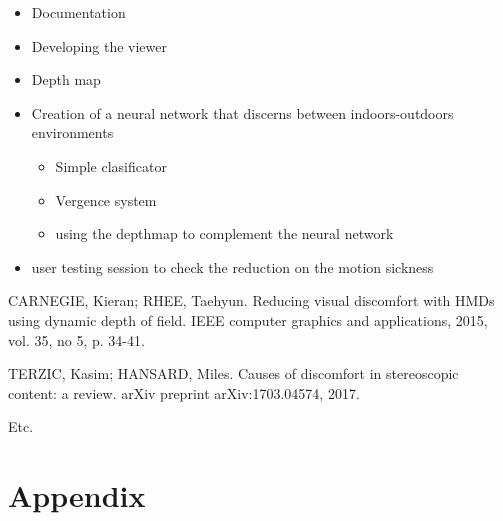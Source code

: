 \documentclass[10pt,a4paper,twocolumn,twoside]{article}
\begin{document}
\begin{itemize}
	\item Documentation 
	\item Developing the viewer
	\item Depth map
	\item Creation of a neural network that discerns between indoors-outdoors environments
			\begin{itemize}
				\item Simple clasificator 
				\item Vergence system
				\item using the depthmap to complement the neural network
			\end{itemize}
	\item user testing session to check the reduction on the motion sickness
\end{itemize}

\begin{thebibliography}{11}
CARNEGIE, Kieran; RHEE, Taehyun. Reducing visual discomfort with HMDs using dynamic depth of field. IEEE computer graphics and applications, 2015, vol. 35, no 5, p. 34-41.

TERZIC, Kasim; HANSARD, Miles. Causes of discomfort in stereoscopic content: a review. arXiv preprint arXiv:1703.04574, 2017.

Etc.


\end{thebibliography}

\appendix

\section*{Appendix}
\end{document}
